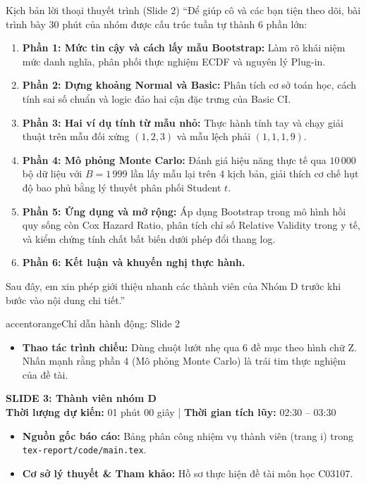 \documentclass[10pt,a4paper]{article}
\newcommand{\slideheader}[4]{
    \vspace{0.4cm}
    \begin{tcolorbox}[colback=primary!7!white, colframe=primary, arc=2mm, boxrule=1pt, left=4mm, right=4mm, top=2.5mm, bottom=2.5mm]
        {\Large\bfseries\color{primary} SLIDE #1: #2}\\[0.1cm]
        {\small\textbf{Thời lượng dự kiến:} #3 \quad | \quad \textbf{Thời gian tích lũy:} #4}
    \end{tcolorbox}
    \vspace{0.15cm}
}
\begin{document}
\begin{scriptbox}{Kịch bản lời thoại thuyết trình (Slide 2)}
    ``Để giúp cô và các bạn tiện theo dõi, bài trình bày 30 phút của nhóm được cấu trúc tuần tự thành 6 phần lớn:
    \begin{enumerate}
        \item \textbf{Phần 1: Mức tin cậy và cách lấy mẫu Bootstrap:} Làm rõ khái niệm mức danh nghĩa, phân phối thực nghiệm ECDF và nguyên lý Plug-in.
        \item \textbf{Phần 2: Dựng khoảng Normal và Basic:} Phân tích cơ sở toán học, cách tính sai số chuẩn và logic đảo hai cận đặc trưng của Basic CI.
        \item \textbf{Phần 3: Hai ví dụ tính từ mẫu nhỏ:} Thực hành tính tay và chạy giải thuật trên mẫu đối xứng $(1,2,3)$ và mẫu lệch phải $(1,1,1,9)$.
        \item \textbf{Phần 4: Mô phỏng Monte Carlo:} Đánh giá hiệu năng thực tế qua $10\,000$ bộ dữ liệu với $B=1\,999$ lần lấy mẫu lại trên 4 kịch bản, giải thích cơ chế hụt độ bao phủ bằng lý thuyết phân phối Student $t$.
        \item \textbf{Phần 5: Ứng dụng và mở rộng:} Áp dụng Bootstrap trong mô hình hồi quy sống còn Cox Hazard Ratio, phân tích chỉ số Relative Validity trong y tế, và kiểm chứng tính chất bất biến dưới phép đổi thang log.
        \item \textbf{Phần 6: Kết luận và khuyến nghị thực hành.}
    \end{enumerate}
    Sau đây, em xin phép giới thiệu nhanh các thành viên của Nhóm D trước khi bước vào nội dung chi tiết.''
\end{scriptbox}

\begin{actionbox}{accentorange}{Chỉ dẫn hành động: Slide 2}
    \begin{itemize}
        \item \textbf{Thao tác trình chiếu:} Dùng chuột lướt nhẹ qua 6 đề mục theo hình chữ Z. Nhấn mạnh rằng phần 4 (Mô phỏng Monte Carlo) là trái tim thực nghiệm của đề tài.
    \end{itemize}
\end{actionbox}

\slideheader{3}{Thành viên nhóm D}{01 phút 00 giây}{02:30 -- 03:30}

\begin{itemize}
    \item \textbf{Nguồn gốc báo cáo:} Bảng phân công nhiệm vụ thành viên (trang i) trong \texttt{tex-report/code/main.tex}.
    \item \textbf{Cơ sở lý thuyết \& Tham khảo:} Hồ sơ thực hiện đề tài môn học C03107.
\end{itemize}
\end{document}
